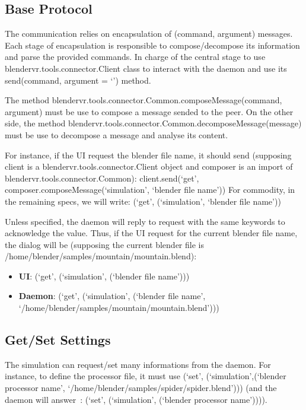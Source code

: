 \documentclass[a4,10pt,openany,oneside]{sphinxmanual}
\begin{document}
\subsection{Base Protocol}
\label{architecture/protocols:base-protocol}
The communication relies on encapsulation of (command, argument) messages. Each stage of encapsulation is responsible to compose/decompose its information and parse the provided commands. In charge of the central stage to use blendervr.tools.connector.Client class to interact with the daemon and use its send(command, argument = `') method.

The method blendervr.tools.connector.Common.composeMessage(command, argument) must be use to compose a message sended to the peer.
On the other side, the method blendervr.tools.connector.Common.decomposeMessage(message) must be use to decompose a message and analyse its content.

For instance, if the UI request the blender file name, it should send (supposing client is a blendervr.tools.connector.Client object and composer is an import of blendervr.tools.connector.Common): client.send(`get', composer.composeMessage(`simulation', `blender file name'))
For commodity, in the remaining specs, we will write: (`get', (`simulation', `blender file name'))

Unless specified, the daemon will reply to request with the same keywords to acknowledge the value. Thus, if the UI request for the current blender file name, the dialog will be (supposing the current blender file is /home/blender/samples/mountain/mountain.blend):
\begin{itemize}
\item {} 
\textbf{UI}: (`get', (`simulation', (`blender file name')))

\item {} 
\textbf{Daemon}: (`get', (`simulation', (`blender file name', `/home/blender/samples/mountain/mountain.blend')))

\end{itemize}


\subsection{Get/Set Settings}
\label{architecture/protocols:get-set-settings}
The simulation can request/set many informations from the daemon. For instance, to define the processor file, it must use (`set', (`simulation',(`blender processor name', `/home/blender/samples/spider/spider.blend'))) (and the daemon will answer : (`set', (`simulation', (`blender processor name')))).
\end{document}

